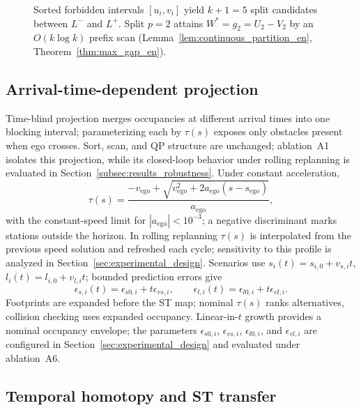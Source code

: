 \begin{figure}
\centering
{}
\caption{Sorted forbidden intervals $[u_i,v_i]$ yield $k+1=5$ split candidates between $L^-$ and $L^+$. Split $p=2$ attains $W^*=g_2=U_2-V_2$ by an $O(k\log k)$ prefix scan (Lemma~\ref{lem:continuous_partition_en}, Theorem~\ref{thm:max_gap_en}).}
\label{fig:max_gap_en}
\end{figure}

\subsection{Arrival-time-dependent projection}
\label{sec:method_projection_en}

Time-blind projection merges occupancies at different arrival times into one blocking interval; parameterizing each by $\tau(s)$ exposes only obstacles present when ego crosses. Sort, scan, and QP structure are unchanged; ablation~A1 isolates this projection, while its closed-loop behavior under rolling replanning is evaluated in Section~\ref{subsec:results_robustness}. Under constant acceleration,
\begin{equation}
 \tau(s)=\frac{-v_{\mathrm{ego}}+\sqrt{v_{\mathrm{ego}}^2+2a_{\mathrm{ego}}(s-s_{\mathrm{ego}})}}{a_{\mathrm{ego}}},
 \label{eq:arrival_time_en}
\end{equation}
with the constant-speed limit for $|a_{\mathrm{ego}}|<10^{-3}$; a negative discriminant marks stations outside the horizon. In rolling replanning $\tau(s)$ is interpolated from the previous speed solution and refreshed each cycle; sensitivity to this profile is analyzed in Section~\ref{sec:experimental_design}. Scenarios use $s_i(t)=s_{i,0}+v_{s,i}t$, $l_i(t)=l_{i,0}+v_{l,i}t$; bounded prediction errors give
\begin{equation}
 \epsilon_{s,i}(t)=\epsilon_{s0,i}+t\epsilon_{vs,i},\qquad
 \epsilon_{l,i}(t)=\epsilon_{l0,i}+t\epsilon_{vl,i}.
 \label{eq:prediction_tube_en}
\end{equation}
Footprints are expanded before the ST map; nominal $\tau(s)$ ranks alternatives, collision checking uses expanded occupancy. Linear-in-$t$ growth provides a nominal occupancy envelope; the parameters $\epsilon_{s0,i}$, $\epsilon_{vs,i}$, $\epsilon_{l0,i}$, and $\epsilon_{vl,i}$ are configured in Section~\ref{sec:experimental_design} and evaluated under ablation~A6.

\subsection{Temporal homotopy and ST transfer}
\label{sec:method_temporal_en}

